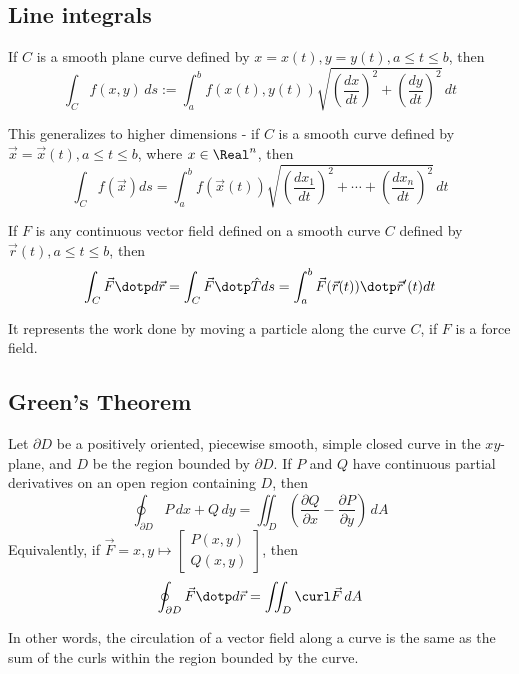 \subsection{Line integrals}

\begin{definition}
  If $C$ is a smooth plane curve defined by $x = x(t), y = y(t), a \leq t \leq b$, then
  \[
    \int_C f(x, y) \,ds := \int_a^b f(x(t), y(t)) \sqrt{\left(\frac{dx}{dt}\right)^2 + \left(\frac{dy}{dt}\right)^2} \,dt
  \]

  This generalizes to higher dimensions - if $C$ is a smooth curve defined by $\vec{x} = \vec{x}(t), a \leq t \leq b$, where $x \in \Real^n$, then
  \[
    \int_C f(\vec{x}) ds = \int_a^b f(\vec{x}(t)) \sqrt{\left(\frac{dx_1}{dt}\right)^2 + \cdots + \left(\frac{dx_n}{dt}\right)^2} \,dt
  \]
\end{definition}

\begin{definition}
  If $F$ is any continuous vector field defined on a smooth curve $C$ defined by $\vec{r}(t), a \leq t \leq b$, then
  \[
    \int_C \vec{F} \dotp d\vec{r} = \int_C \vec{F} \dotp \hat{T} ds = \int_a^b \vec{F}(\vec{r}(t)) \dotp \vec{r}'(t) dt
  \]

  It represents the work done by moving a particle along the curve $C$, if $F$ is a force field.
\end{definition}




\subsection{Green's Theorem}

\begin{namedtheorem}
  Let $\partial D$ be a positively oriented, piecewise smooth, simple closed curve in the $xy$-plane, and $D$ be the region bounded by $\partial D$. If $P$ and $Q$ have continuous partial derivatives on an open region containing $D$, then
  \[
    \oint_{\partial D} P \,dx + Q \,dy = \iint_D \left(\frac{\partial Q}{\partial x} - \frac{\partial P}{\partial y}\right) \,dA
  \]
  Equivalently, if $\vec{F} = x, y \mapsto \begin{bmatrix}
    P(x, y) \\
    Q(x, y)
  \end{bmatrix}$, then
  \[
    \oint_{\partial D} \vec{F} \dotp d\vec{r} = \iint_D \curl \vec{F} \,dA
  \]

  In other words, the circulation of a vector field along a curve is the same as the sum of the curls within the region bounded by the curve.
\end{namedtheorem}

